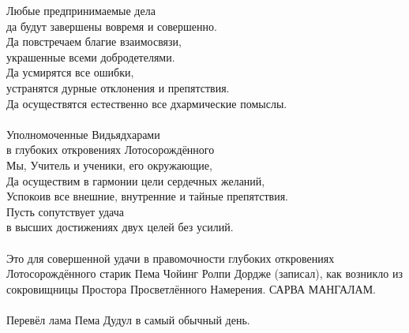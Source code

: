 Любые предпринимаемые дела \\ \indent да будут завершены вовремя и совершенно.\\
Да повстречаем благие взаимосвязи, \\ \indent украшенные всеми добродетелями. \\
Да усмирятся все ошибки, \\ \indent устранятся дурные отклонения и препятствия.\\
Да осуществятся естественно все дхармические помыслы.\\
\\
Уполномоченные Видьядхарами \\ \indent в глубоких откровениях Лотосорождённого \\
Мы, Учитель и ученики, его окружающие, \\
Да осуществим в гармонии цели сердечных желаний,\\
Успокоив все внешние, внутренние и тайные препятствия.\\
Пусть сопутствует удача \\ \indent в высших достижениях двух целей без усилий.\\
\\
\scriptsize
Это для совершенной удачи в правомочности глубоких откровениях
Лотосорождённого старик Пема Чойинг Ролпи Дордже (записал),
как возникло из сокровищницы Простора Просветлённого Намерения. САРВА МАНГАЛАМ.\\
\\
Перевёл лама Пема Дудул в самый обычный день.\normalsize
